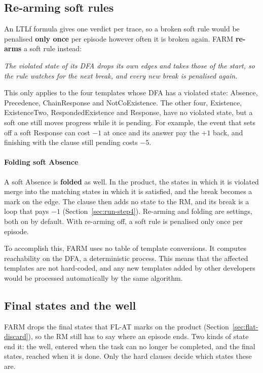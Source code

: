 \documentclass[11pt,english,listoffigures,listoftables]{tfgetsinf}
\newcommand{\keyidea}[1]{\par\smallskip\noindent\hspace*{0.6em}{\color{gray!55}\vrule width 1.5pt}\hspace{8pt}\parbox[t]{\dimexpr\linewidth-0.6em-9.5pt\relax}{\itshape #1}\par\smallskip}  %
\begin{document}
\subsection{Re-arming soft rules}
\label{sec:recurrent}
An LTLf formula gives one verdict per trace, so a broken soft rule would be penalised \textbf{only once} per episode however often it is broken again. FARM \textbf{re-arms} a soft rule instead: 

\keyidea{The violated state of its DFA drops its own edges and takes those of the start, so the rule watches for the next break, and every new break is penalised again.} 

This only applies to the four templates whose DFA has a violated state: Absence, Precedence, ChainResponse and NotCoExistence. The other four, Existence, ExistenceTwo, RespondedExistence and Response, have no violated state, but a soft one still moves progress while it is pending. For example, the event that sets off a soft Response can cost $-1$ at once and its answer pay the $+1$ back, and finishing with the clause still pending costs $-5$.

\paragraph{Folding soft Absence} A soft Absence is \textbf{folded} as well. In the product, the states in which it is violated merge into the matching states in which it is satisfied, and the break becomes a mark on the edge. The clause then adds no state to the RM, and its break is a loop that pays $-1$ (Section~\ref{sec:run-step4}). Re-arming and folding are settings, both on by default. With re-arming off, a soft rule is penalised only once per episode.

To accomplish this, FARM uses no table of template conversions. It computes reachability on the DFA, a deterministic process. This means that the affected templates are not hard-coded, and any new templates added by other developers would be processed automatically by the same algorithm.

\subsection{Final states and the well}
\label{sec:final-well}
FARM drops the final states that FL-AT marks on the product (Section~\ref{sec:flat-discard}), so the RM still has to say where an episode ends. Two kinds of state end it: the well, entered when the task can no longer be completed, and the final states, reached when it is done. Only the hard clauses decide which states these are.
\end{document}
